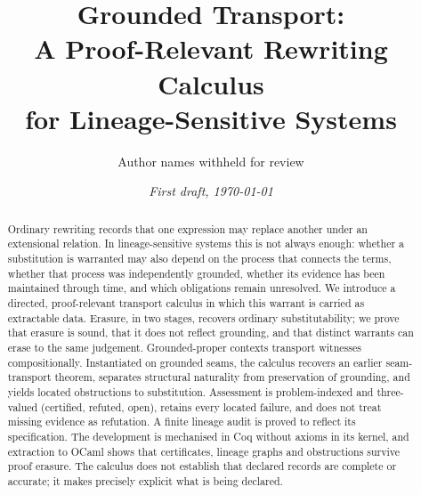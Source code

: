 \documentclass[11pt,a4paper]{article}
\title{Grounded Transport:\\ A Proof-Relevant Rewriting Calculus\\ for Lineage-Sensitive Systems}
\author{Author names withheld for review}
\date{\textit{First draft, \today}}
\theoremstyle{plain}
\theoremstyle{definition}
\theoremstyle{remark}
\begin{document}
\maketitle

\begin{abstract}
Ordinary rewriting records that one expression may replace another under an extensional relation.
In lineage-sensitive systems this is not always enough: whether a substitution is warranted may also depend on the process that connects the terms, whether that process was independently grounded, whether its evidence has been maintained through time, and which obligations remain unresolved.
We introduce a directed, proof-relevant transport calculus in which this warrant is carried as extractable data.
Erasure, in two stages, recovers ordinary substitutability; we prove that erasure is sound, that it does not reflect grounding, and that distinct warrants can erase to the same judgement.
Grounded-proper contexts transport witnesses compositionally.
Instantiated on grounded seams, the calculus recovers an earlier seam-transport theorem, separates structural naturality from preservation of grounding, and yields located obstructions to substitution.
Assessment is problem-indexed and three-valued (certified, refuted, open), retains every located failure, and does not treat missing evidence as refutation.
A finite lineage audit is proved to reflect its specification.
The development is mechanised in Coq without axioms in its kernel, and extraction to OCaml shows that certificates, lineage graphs and obstructions survive proof erasure.
The calculus does not establish that declared records are complete or accurate; it makes precisely explicit what is being declared.
\end{abstract}





















\appendix

\end{document}
